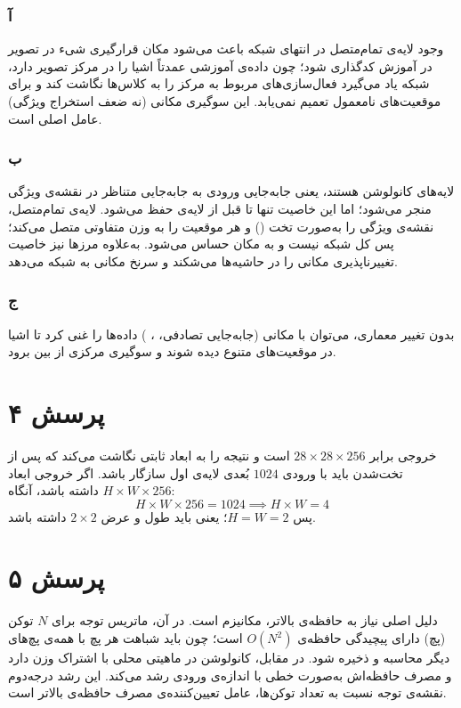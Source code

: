 \subsubsection*{آ}
وجود لایه‌ی تمام‌متصل در انتهای شبکه باعث می‌شود مکان قرارگیری شیء در تصویر در آموزش کدگذاری شود؛ چون داده‌ی آموزشی عمدتاً اشیا را در مرکز تصویر دارد، شبکه یاد می‌گیرد فعال‌سازی‌های مربوط به مرکز را به کلاس‌ها نگاشت کند و برای موقعیت‌های نامعمول تعمیم نمی‌یابد. این سوگیری مکانی (نه ضعف استخراج ویژگی) عامل اصلی است.

\subsubsection*{ب}
لایه‌های کانولوشن  هستند، یعنی جابه‌جایی ورودی به جابه‌جایی متناظر در نقشه‌ی ویژگی منجر می‌شود؛ اما این خاصیت تنها تا قبل از لایه‌ی  حفظ می‌شود. لایه‌ی تمام‌متصل، نقشه‌ی ویژگی را به‌صورت تخت () و هر موقعیت را به وزن متفاوتی متصل می‌کند؛ پس کل شبکه  نیست و به مکان حساس می‌شود. به‌علاوه  مرزها نیز خاصیت تغییرناپذیری مکانی را در حاشیه‌ها می‌شکند و سرنخ مکانی به شبکه می‌دهد.

\subsubsection*{ج}
بدون تغییر معماری، می‌توان با  مکانی (جابه‌جایی تصادفی، ، ) داده‌ها را غنی کرد تا اشیا در موقعیت‌های متنوع دیده شوند و سوگیری مرکزی از بین برود.

\section*{پرسش ۴}

خروجی  برابر $28 \times 28 \times 256$ است و  نتیجه را به ابعاد ثابتی نگاشت می‌کند که پس از تخت‌شدن باید با ورودی $1024$ بُعدی لایه‌ی اول سازگار باشد. اگر خروجی  ابعاد $H \times W \times 256$ داشته باشد، آنگاه:
$$H \times W \times 256 = 1024 \implies H \times W = 4$$
پس $H = W = 2$؛ یعنی  باید طول و عرض $2 \times 2$ داشته باشد.

\section*{پرسش ۵}

دلیل اصلی نیاز  به حافظه‌ی  بالاتر، مکانیزم  است. در آن، ماتریس توجه برای $N$ توکن (پچ) دارای پیچیدگی حافظه‌ی $O(N^2)$ است؛ چون باید شباهت هر پچ با همه‌ی پچ‌های دیگر محاسبه و ذخیره شود. در مقابل، کانولوشن در  ماهیتی محلی با اشتراک وزن دارد و مصرف حافظه‌اش به‌صورت خطی با اندازه‌ی ورودی رشد می‌کند. این رشد درجه‌دوم نقشه‌ی توجه نسبت به تعداد توکن‌ها، عامل تعیین‌کننده‌ی مصرف حافظه‌ی بالاتر  است.